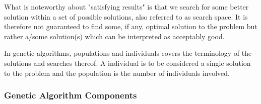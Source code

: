 What is noteworthy about "satisfying results" is that we search for some better solution within a set of possible solutions, also referred to as search space. It is therefore not guaranteed to find some, if any, optimal solution to the problem but rather a/some solution(s) which can be interpreted as acceptably good. \cite[pp. 20/21]{Sivanandam2008}


In genetic algorithms, populations and individuals covers the terminology of the solutions and searches thereof. A individual is to be considered a single solution to the problem and the population is the number of individuals involved. \cite[pp. 39]{Sivanandam2008}



\subsubsection{Genetic Algorithm Components}

